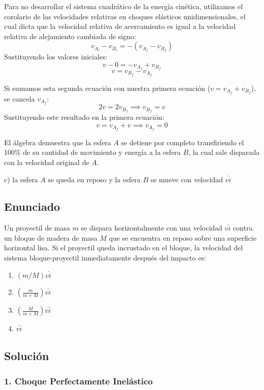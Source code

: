\documentclass[12pt, a4paper]{article}
\begin{document}
Para no desarrollar el sistema cuadrático de la energía cinética, utilizamos el corolario de las velocidades relativas en choques elásticos unidimensionales, el cual dicta que la velocidad relativa de acercamiento es igual a la velocidad relativa de alejamiento cambiada de signo:
$$ v_{A_i} - v_{B_i} = -(v_{A_f} - v_{B_f}) $$
Sustituyendo los valores iniciales:
$$ v - 0 = -v_{A_f} + v_{B_f} $$
$$ v = v_{B_f} - v_{A_f} $$

Si sumamos esta segunda ecuación con nuestra primera ecuación ($v = v_{A_f} + v_{B_f}$), se cancela $v_{A_f}$:
$$ 2v = 2v_{B_f} \implies v_{B_f} = v $$
Sustituyendo este resultado en la primera ecuación:
$$ v = v_{A_f} + v \implies v_{A_f} = 0 $$

El álgebra demuestra que la esfera $A$ se detiene por completo transfiriendo el 100\% de su cantidad de movimiento y energía a la esfera $B$, la cual sale disparada con la velocidad original de $A$.

\begin{tcolorbox}[colback=green!5!white, colframe=green!50!black, title=Respuesta Final]
\centering \Large c) la esfera $A$ se queda en reposo y la esfera $B$ se mueve con velocidad $v\hat{i}$
\end{tcolorbox}

\newpage

\subsection*{Enunciado}
Un proyectil de masa $m$ se dispara horizontalmente con una velocidad $v\hat{i}$ contra un bloque de madera de masa $M$ que se encuentra en reposo sobre una superficie horizontal lisa. Si el proyectil queda incrustado en el bloque, la velocidad del sistema bloque-proyectil inmediatamente después del impacto es:
\begin{enumerate}[label=\alph*)]
    \item $(m/M)v\hat{i}$
    \item $\left(\frac{m}{m+M}\right)v\hat{i}$
    \item $\left(\frac{M}{m+M}\right)v\hat{i}$
    \item $v\hat{i}$
\end{enumerate}

\subsection*{Solución}

\subsubsection*{1. Choque Perfectamente Inelástico}
\end{document}
